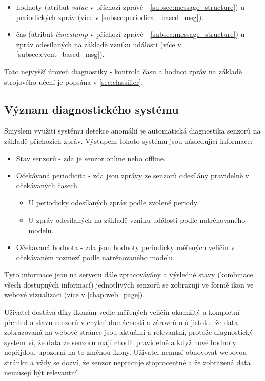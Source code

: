 \begin{itemize}
	\item hodnoty (atribut \textit{value} v příchozí zprávě - \cref{subsec:message_structure}) u periodických zpráv (více v \cref{subsec:periodical_based_msg}).
	\item čas (atribut \textit{timestamp} v příchozí zprávě - \cref{subsec:message_structure}) u zpráv odesílaných na základě vzniku události (více v \cref{subsec:event_based_msg}). 
\end{itemize}

Tato nejvyšší úroveň diagnostiky - kontrola času a hodnot zpráv na základě strojového učení je popsána v \cref{sec:classifier}. 

\subsection*{Význam diagnostického systému}
Smyslem využití systému detekce anomálií je automatická diagnostika senzorů na základě příchozích zpráv. Výstupem tohoto systému jsou následující informace:

\begin{itemize}
 	\item Stav senzorů - zda je senzor online nebo offline. 
	\item Očekávaná periodicita - zda jsou zprávy ze senzorů odesílány pravidelně v očekávaných časech.
	\begin{itemize}
		\item U periodicky odesílaných zpráv podle zvolené periody.
		\item U zpráv odesílaných na základě vzniku události podle natrénovaného modelu.
	\end{itemize}
	\item Očekávaná hodnota - zda jsou hodnoty periodicky měřených veličin v očekávaném rozmezí podle natrénovaného modelu.
\end{itemize}

Tyto informace jsou na serveru dále zpracovávány a výsledné stavy (kombinace všech dostupných informací) jednotlivých senzorů se zobrazují ve formě ikon ve webové vizualizaci (více v \cref{chap:web_page}). \par
Uživatel dostává díky ikonám vedle měřených veličin okamžitý a kompletní přehled o stavu senzorů v chytré domácnosti a zároveň má jistotu, že data zobrazovaná na webové stránce jsou aktuální a relevantní, protože diagnostický systém ví, že data ze senzorů mají chodit pravidelně a když nové hodnoty nepřijdou, upozorní na to změnou ikony. Uživatel nemusí obnovovat webovou stránku a vždy se dozví, že senzor nepracuje stoprocentně a že zobrazená data nemusejí být relevantní. 

